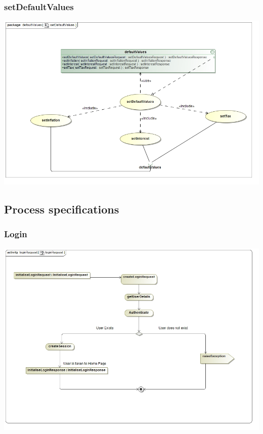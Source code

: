 \documentclass[a4paper,12pt]{article}
\begin{document}
\subsubsection{setDefaultValues}
\includegraphics[width=1\textwidth]{./Images/requiredFunctionality/setDefaultValuesUseCase.jpg}

\subsection{Process specifications}
\subsubsection{Login}
\includegraphics[width=1\textwidth]{./Images/processSpecification/Priscilla/loginRequest.jpg}
\end{document}
